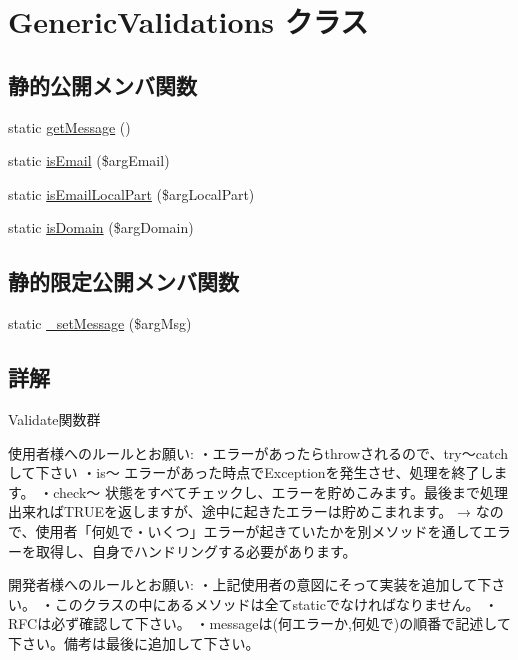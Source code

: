 \hypertarget{class_generic_validations}{}\section{Generic\+Validations クラス}
\label{class_generic_validations}
\subsection*{静的公開メンバ関数}
\begin{DoxyCompactItemize}
\item 
static \hyperlink{class_generic_validations_a681b7f3cad2d9b67411ea5c735630864}{get\+Message} ()
\item 
static \hyperlink{class_generic_validations_a486033594fbf4b179d945e193b3e4457}{is\+Email} (\$arg\+Email)
\item 
static \hyperlink{class_generic_validations_a20ce23b0a0a08aa9f5ced1ce3779cbd6}{is\+Email\+Local\+Part} (\$arg\+Local\+Part)
\item 
static \hyperlink{class_generic_validations_a1801ae388b49921d472d30a0f0f13b3d}{is\+Domain} (\$arg\+Domain)
\end{DoxyCompactItemize}
\subsection*{静的限定公開メンバ関数}
\begin{DoxyCompactItemize}
\item 
static \hyperlink{class_generic_validations_a3ab137d4611ed390ff79382224d4ad05}{\+\_\+set\+Message} (\$arg\+Msg)
\end{DoxyCompactItemize}


\subsection{詳解}
Validate関数群

使用者様へのルールとお願い\+: ・エラーがあったらthrowされるので、try〜catchして下さい ・is〜 エラーがあった時点で\+Exceptionを発生させ、処理を終了します。 ・check〜 状態をすべてチェックし、エラーを貯めこみます。最後まで処理出来れば\+T\+R\+U\+Eを返しますが、途中に起きたエラーは貯めこまれます。 → なので、使用者「何処で・いくつ」エラーが起きていたかを別メソッドを通してエラーを取得し、自身でハンドリングする必要があります。

開発者様へのルールとお願い\+: ・上記使用者の意図にそって実装を追加して下さい。 ・このクラスの中にあるメソッドは全てstaticでなければなりません。 ・\+R\+F\+Cは必ず確認して下さい。 ・messageは(何エラーか,何処で)の順番で記述して下さい。備考は最後に追加して下さい。

